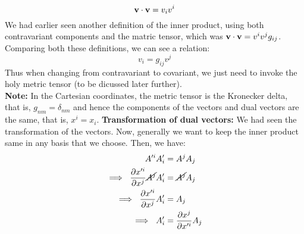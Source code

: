 $$\boldsymbol{\mathbf{v}}\cdot\boldsymbol{\mathbf{v}} = v_i v^i $$
\noindent
We had earlier seen another definition of the inner product, using both contravariant components and the matric tensor, which was $\boldsymbol{\mathbf{v}}\cdot\boldsymbol{\mathbf{v}} = v^i v^j g_{ij}$. Comparing both these definitions, we can see a relation:
$$v_i = g_{ij} v^j$$
Thus when changing from contravariant to covariant, we just need to invoke the holy metric tensor (to be dicussed later further).\\[0.3cm]
\noindent
\textbf{Note:} In the Cartesian coordinates, the metric tensor is the Kronecker delta, that is, $g_{nm} = \delta_{nm}$ and hence the components of the vectors and dual vectors are the same, that is, $x^i = x_i$. 
\textbf{Transformation of dual vectors:}
We had seen the transformation of the vectors. Now, generally we want to keep the inner product same in any basis that we choose. Then, we have:
\begin{align*}
    A'^iA'_i &= A^j A_j\\
  \implies\  \pdv{x'^i}{x^j}\cancel{ A^j} A'_i &= \cancel{A^j} A_j\\
   \implies\ \pdv{x'^i}{x^j} A'_i &= A_j \\
   \implies\ A'_i &= \pdv{x^j}{x'^i} A_j
\end{align*}